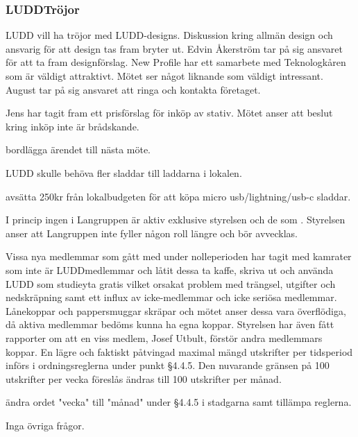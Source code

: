 \documentclass{protokoll}
\begin{document}
\subsubsection{LUDDTröjor}
LUDD vill ha tröjor med LUDD-designs. Diskussion kring allmän design och ansvarig för att design tas fram bryter ut. 
Edvin Åkerström tar på sig ansvaret för att ta fram designförslag. 
New Profile har ett samarbete med Teknologkåren som är väldigt attraktivt. Mötet ser något liknande som väldigt intressant.
August tar på sig ansvaret att ringa och kontakta företaget.

Jens har tagit fram ett prisförslag för inköp av stativ. Mötet anser att beslut kring inköp inte är brådskande. 
\begin{beslut}
    \att bordlägga ärendet till nästa möte.
\end{beslut}
LUDD skulle behöva fler sladdar till laddarna i lokalen. 
\begin{beslut}
    \att avsätta 250kr från lokalbudgeten för att köpa micro usb/lightning/usb-c sladdar.
\end{beslut}

I princip ingen i Langruppen är aktiv exklusive styrelsen och de som .
Styrelsen anser att Langruppen inte fyller någon roll längre och bör avvecklas.

Vissa nya medlemmar som gått med under nolleperioden har tagit med kamrater som inte är LUDDmedlemmar och låtit dessa ta kaffe, skriva ut och använda LUDD som studieyta gratis vilket orsakat problem med trängsel, utgifter och nedskräpning samt ett influx av icke-medlemmar och icke seriösa medlemmar. 
Lånekoppar och pappersmuggar skräpar och mötet anser dessa vara överflödiga, då aktiva medlemmar bedöms kunna ha egna koppar. Styrelsen har även fått rapporter om att en viss medlem, Josef Utbult, förstör andra medlemmars koppar.
En lägre och faktiskt påtvingad maximal mängd utskrifter per tidsperiod införs i ordningsreglerna under punkt §4.4.5. Den nuvarande gränsen på 100 utskrifter per vecka föreslås ändras till 100 utskrifter per månad. 
\begin{beslut}
    \att ändra ordet "vecka" till "månad" under §4.4.5 i stadgarna samt tillämpa reglerna.
\end{beslut}
Inga övriga frågor.
\end{document}
